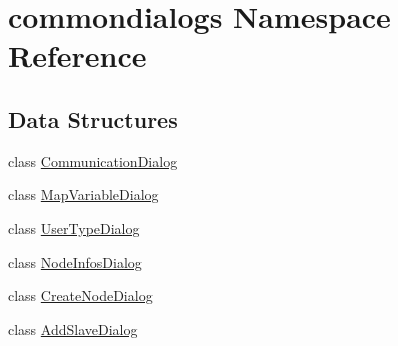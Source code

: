 \hypertarget{namespacecommondialogs}{
\section{commondialogs Namespace Reference}
\label{namespacecommondialogs}
}


\subsection*{Data Structures}
\begin{CompactItemize}
\item 
class \hyperlink{classcommondialogs_1_1CommunicationDialog}{Communication\-Dialog}
\item 
class \hyperlink{classcommondialogs_1_1MapVariableDialog}{Map\-Variable\-Dialog}
\item 
class \hyperlink{classcommondialogs_1_1UserTypeDialog}{User\-Type\-Dialog}
\item 
class \hyperlink{classcommondialogs_1_1NodeInfosDialog}{Node\-Infos\-Dialog}
\item 
class \hyperlink{classcommondialogs_1_1CreateNodeDialog}{Create\-Node\-Dialog}
\item 
class \hyperlink{classcommondialogs_1_1AddSlaveDialog}{Add\-Slave\-Dialog}
\end{CompactItemize}
